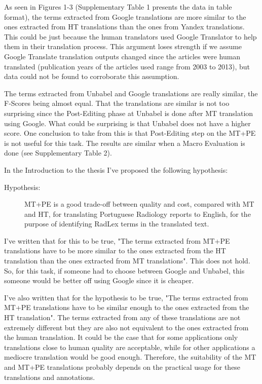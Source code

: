 As seen in Figures 1-3 (Supplementary Table 1 presents the data in table format), the terms extracted from Google translations are more similar to the ones extracted from HT translations than the ones from Yandex translations. This could be just because the human translators used Google Translator to help them in their translation process. This argument loses strength if we assume Google Translate translation outputs changed since the articles were human translated (publication years of the articles used range from 2003 to 2013), but data could not be found to corroborate this assumption. 

The terms extracted from Unbabel and Google translations are really similar, the F-Scores being almost equal. That the translations are similar is not too surprising since the Post-Editing phase at Unbabel is done after MT translation using Google. What could be surprising is that Unbabel does not have a higher score. One conclusion to take from this is that Post-Editing step on the MT+PE is not useful for this task. The results are similar when a Macro Evaluation is done (see Supplementary Table 2).

In the Introduction to the thesis I've proposed the following hypothesis:

\begin{description}
	\item[Hypothesis:] MT+PE is a good trade-off between quality and cost, compared with MT and HT, for translating Portuguese Radiology reports to English, for the purpose of identifying RadLex terms in the translated text. 
\end{description}

I've written that for this to be true, "The terms extracted from MT+PE translations have to be more similar to the ones extracted from the HT translation than the ones extracted from MT translations". This does not hold. So, for this task, if someone had to choose between Google and Unbabel, this someone would be better off using Google since it is cheaper. 

I've also written that for the hypothesis to be true, "The terms extracted from MT+PE translations have to be similar enough to the ones extracted from the HT translation". The terms extracted from any of these translations are not extremely different but they are also not equivalent to the ones extracted from the human translation. It could be the case that for some applications only translations close to human quality are acceptable, while for other applications a mediocre translation would be good enough. Therefore, the suitability of the MT and MT+PE translations probably depends on the practical usage for these translations and annotations. 

